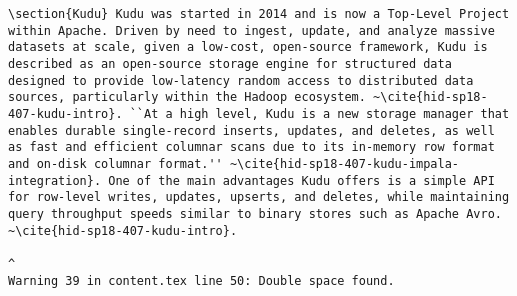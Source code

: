 \begin{tiny}
\begin{verbatim}
\section{Kudu} Kudu was started in 2014 and is now a Top-Level Project within Apache. Driven by need to ingest, update, and analyze massive datasets at scale, given a low-cost, open-source framework, Kudu is described as an open-source storage engine for structured data designed to provide low-latency random access to distributed data sources, particularly within the Hadoop ecosystem. ~\cite{hid-sp18-407-kudu-intro}. ``At a high level, Kudu is a new storage manager that enables durable single-record inserts, updates, and deletes, as well as fast and efficient columnar scans due to its in-memory row format and on-disk columnar format.'' ~\cite{hid-sp18-407-kudu-impala-integration}. One of the main advantages Kudu offers is a simple API for row-level writes, updates, upserts, and deletes, while maintaining query throughput speeds similar to binary stores such as Apache Avro. ~\cite{hid-sp18-407-kudu-intro}.  
                                                                                                                                                                                                                                                                                                                                                                                                                                                                                                                                                                                                                                                                                                                                                                                                                                                                                                                     ^
Warning 39 in content.tex line 50: Double space found.

\end{verbatim}
\end{tiny}
